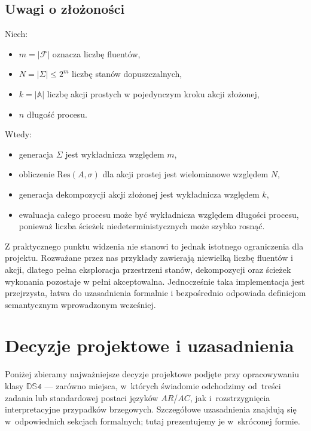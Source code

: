 \documentclass[11pt,a4paper]{article}
\theoremstyle{definition}
\begin{document}
\subsection{Uwagi o złożoności}

Niech:
\begin{itemize}
    \item $m = |\mathcal{F}|$ oznacza liczbę fluentów,
    \item $N = |\Sigma| \leq 2^m$ liczbę stanów dopuszczalnych,
    \item $k = |\mathbb{A}|$ liczbę akcji prostych w pojedynczym kroku akcji złożonej,
    \item $n$ długość procesu.
\end{itemize}

Wtedy:
\begin{itemize}
    \item generacja $\Sigma$ jest wykładnicza względem $m$,
    \item obliczenie $\mathrm{Res}(A,\sigma)$ dla akcji prostej jest wielomianowe względem $N$,
    \item generacja dekompozycji akcji złożonej jest wykładnicza względem $k$,
    \item ewaluacja całego procesu może być wykładnicza względem długości procesu, ponieważ liczba ścieżek niedeterministycznych może szybko rosnąć.
\end{itemize}

Z praktycznego punktu widzenia nie stanowi to jednak istotnego ograniczenia dla projektu. Rozważane przez nas przykłady zawierają niewielką liczbę fluentów i akcji, dlatego pełna eksploracja przestrzeni stanów, dekompozycji oraz ścieżek wykonania pozostaje w pełni akceptowalna. Jednocześnie taka implementacja jest przejrzysta, łatwa do uzasadnienia formalnie i bezpośrednio odpowiada definicjom semantycznym wprowadzonym wcześniej.

\section{Decyzje projektowe i uzasadnienia}

Poniżej zbieramy najważniejsze decyzje projektowe podjęte przy opracowywaniu klasy $\mathbb{DS4}$ --- zarówno miejsca, w~których świadomie odchodzimy od~treści zadania lub standardowej postaci języków $AR$/$AC$, jak i~rozstrzygnięcia interpretacyjne przypadków brzegowych. Szczegółowe uzasadnienia znajdują się w~odpowiednich sekcjach formalnych; tutaj prezentujemy je w~skróconej formie.
\end{document}
